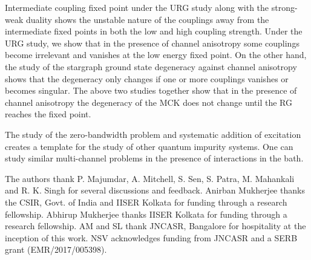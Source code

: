 \documentclass[reprint,prb,superscriptaddress]{revtex4-1}
\begin{document}
\par Intermediate coupling fixed point under the URG study along with the strong-weak duality shows the unstable nature of the couplings away from the intermediate fixed points in both the low and high coupling strength. Under the URG study, we show that in the presence of channel anisotropy some couplings become irrelevant and vanishes at the low energy fixed point. On the other hand, the study of the stargraph ground state degeneracy against channel anisotropy shows that the degeneracy only changes if one or more couplings vanishes or becomes singular. The above two studies together show that in the presence of channel anisotropy the degeneracy of the MCK does not change until the RG reaches the fixed point.

\par The study of the zero-bandwidth problem and systematic addition of excitation creates a template for the study of other quantum impurity systems. One can study similar multi-channel problems in the presence of interactions in the bath. 



\acknowledgments
The authors thank P. Majumdar, A. Mitchell, S. Sen, S. Patra, M. Mahankali and R. K. Singh for several discussions and feedback. Anirban Mukherjee thanks the CSIR, Govt. of India and IISER Kolkata for funding through a research fellowship. Abhirup Mukherjee thanks IISER Kolkata for funding through a research fellowship. AM and SL thank JNCASR, Bangalore for hospitality at the inception of this work. NSV acknowledges funding from JNCASR and a SERB grant (EMR/2017/005398).


\end{document}
